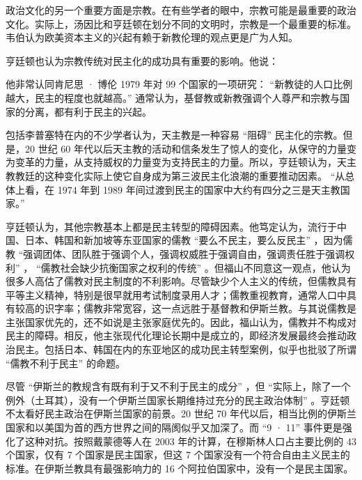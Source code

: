 政治文化的另一个重要方面是宗教。在有些学者的眼中，宗教可能是最重要的政治文化。实际上，汤因比和亨廷顿在划分不同的文明时，宗教是一个最重要的标准。韦伯认为欧美资本主义的兴起有赖于新教伦理的观点更是广为人知。

亨廷顿也认为宗教传统对民主化的成功具有重要的影响。他说：


他非常认同肯尼思 · 博伦 1979 年对 99 个国家的一项研究： “新教徒的人口比例越大，民主的程度也就越高。” 通常认为，基督教或新教强调个人尊严和宗教与国家的分离，都有利于民主的兴起。

包括李普塞特在内的不少学者认为，天主教是一种容易 “阻碍” 民主化的宗教。但是，20 世纪 60 年代以后天主教的活动和信条发生了惊人的变化，从保守的力量变为变革的力量，从支持威权的力量变为支持民主的力量。所以，亨廷顿认为，天主教教廷的这种变化实际上使它自身成为第三波民主化浪潮的重要推动因素。 “从总体上看，在 1974 年到 1989 年间过渡到民主的国家中大约有四分之三是天主教国家。” 

亨廷顿认为，其他宗教基本上都是民主转型的障碍因素。他笃定认为，流行于中国、日本、韩国和新加坡等东亚国家的儒教 “要么不民主，要么反民主” ，因为儒教 “强调团体、团队胜于强调个人，强调权威胜于强调自由，强调责任胜于强调权利” ， “儒教社会缺少抗衡国家之权利的传统” 。但福山不同意这一观点，他认为很多人高估了儒教对民主制度的不利影响。尽管缺少个人主义的传统，但儒教具有平等主义精神，特别是很早就用考试制度录用人才；儒教重视教育，通常人口中具有较高的识字率；儒教非常宽容，这一点远胜于基督教和伊斯兰教。与其说儒教是主张国家优先的，还不如说是主张家庭优先的。因此，福山认为，儒教并不构成对民主的障碍。相反，他主张现代化理论长期中是成立的，即经济发展最终会推动政治民主。包括日本、韩国在内的东亚地区的成功民主转型案例，似乎也批驳了所谓 “儒教不利于民主” 的命题。

尽管 “伊斯兰的教规含有既有利于又不利于民主的成分” ，但 “实际上，除了一个例外（土耳其），没有一个伊斯兰国家长期维持过充分的民主政治体制” 。亨廷顿不太看好民主政治在伊斯兰国家的前景。20 世纪 70 年代以后，相当比例的伊斯兰国家和以美国为首的西方世界之间的隔阂似乎又加深了。而 “9 · 11” 事件更是强化了这种对抗。按照戴蒙德等人在 2003 年的计算，在穆斯林人口占主要比例的 43 个国家，仅有 7 个国家是民主国家，但这 7 个国家没有一个符合自由主义民主的标准。在伊斯兰教具有最强影响力的 16 个阿拉伯国家中，没有一个是民主国家。

